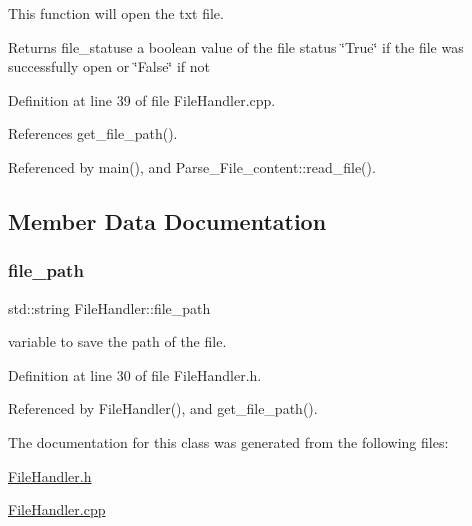 This function will open the txt file. 

\begin{DoxyReturn}{Returns}
file\+\_\+statuse a boolean value of the file status \char`\"{}\+True\char`\"{} if the file was successfully open or \char`\"{}\+False\char`\"{} if not 
\end{DoxyReturn}


Definition at line 39 of file File\+Handler.\+cpp.



References get\+\_\+file\+\_\+path().



Referenced by main(), and Parse\+\_\+\+File\+\_\+content\+::read\+\_\+file().



\subsection{Member Data Documentation}
\mbox{\label{class_file_handler_a1683e00c3112530e697703c327e21c9b}} 
\subsubsection{\texorpdfstring{file\+\_\+path}{file\_path}}
{\footnotesize\ttfamily std\+::string File\+Handler\+::file\+\_\+path\hspace{0.3cm}{\ttfamily [private]}}



variable to save the path of the file. 



Definition at line 30 of file File\+Handler.\+h.



Referenced by File\+Handler(), and get\+\_\+file\+\_\+path().



The documentation for this class was generated from the following files\+:\begin{DoxyCompactItemize}
\item 
\mbox{\hyperlink{_file_handler_8h}{File\+Handler.\+h}}\item 
\mbox{\hyperlink{_file_handler_8cpp}{File\+Handler.\+cpp}}\end{DoxyCompactItemize}
